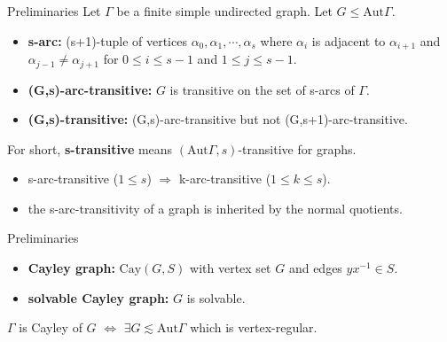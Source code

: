 \documentclass{beamer}
\def\Aut{\mathrm{Aut}}
\def\Cay{\mathrm{Cay}}
\begin{document}
\begin{frame}{Preliminaries}
Let $\Gamma$ be a finite simple undirected graph. Let $G\leq \Aut\Gamma$.
\begin{definition}
	\begin{itemize}
		\item \textbf{s-arc:} (s+1)-tuple of vertices $\alpha_0,\alpha_1,\cdots,\alpha_s$ where $\alpha_i$ is adjacent to $\alpha_{i+1}$ and $\alpha_{j-1}\neq\alpha_{j+1}$ for $0\leq i\leq s-1$ and $1\leq j\leq s-1$.
		\item \textbf{(G,s)-arc-transitive:} $G$ is transitive on the set of s-arcs of $\Gamma$.
		\item \textbf{(G,s)-transitive:} (G,s)-arc-transitive but not (G,s+1)-arc-transitive.
	\end{itemize}
For short, \textbf{s-transitive} means $(\Aut\Gamma,s)$-transitive for graphs.
\end{definition}
\begin{lemma}
	\begin{itemize}
		\item s-arc-transitive ($1\leq s$) $\Longrightarrow$ k-arc-transitive ($1\leq k\leq s$).
		\item the s-arc-transitivity of a graph is inherited by the normal quotients.
	\end{itemize} 
\end{lemma}
\end{frame}

\begin{frame}{Preliminaries}
\begin{definition}
	\begin{itemize}
		\item \textbf{Cayley graph:} $\Cay(G,S)$ with vertex set $G$ and edges $yx^{-1}\in S$.
		\item \textbf{solvable Cayley graph:} $G$ is solvable.
	\end{itemize}
\end{definition}
\begin{lemma}
	\center $\Gamma$ is Cayley of $G$ $\iff$ $\exists G\lesssim \Aut\Gamma$ which is vertex-regular.
\end{lemma}
\end{frame}
\end{document}
